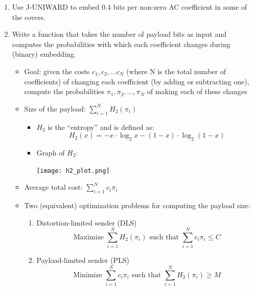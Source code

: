 \documentclass[11pt,a4paper]{report}
\begin{document}
\begin{itemize}
\begin{enumerate}
  \item Use J-UNIWARD to embed 0.4 bits per non-zero AC coefficient in some of the covers.

  \item Write a function that takes the number of payload bits as input and computes the probabilities with which each coefficient changes during (binary) embedding.
    \begin{itemize}
    \item Goal: given the costs $c_1, c_2, ... c_N$ (where N is the total number of coefficients) of changing each coefficient (by adding or subtracting one), compute the probabilities $\pi_1, \pi_2, ..., \pi_N$ of making each of these changes

    \item Size of the payload: $\sum\limits_{i=1}^N H_2(\pi_i)$
      \begin{itemize}
      \item $H_2$ is the ``entropy'' and is defined as:
        \begin{equation*}
        H_2(x) = -x \cdot \log_2 x - (1-x) \cdot \log_2 (1-x)
        \end{equation*}

      \item Graph of $H_2$:
        \begin{center}
          \texttt{[image: h2\_plot.png]}
        \end{center}
      \end{itemize}

    \item Average total cost: $\sum\limits_{i=1}^N c_i \pi_i$

    \item Two (equivalent) optimization problems for computing the payload size:
      \begin{enumerate}
      \item Distortion-limited sender (DLS)
        \begin{equation*}
        \text{Maximize } \sum\limits_{i=1}^N H_2(\pi_i) \text{ such that } \sum\limits_{i=1}^N c_i \pi_i \leq C
        \end{equation*}

      \item Payload-limited sender (PLS)
        \begin{equation*}
        \text{Minimize } \sum\limits_{i=1}^N c_i \pi_i \text{ such that } \sum\limits_{i=1}^N H_2(\pi_i) \geq M
        \end{equation*}
      \end{enumerate}


\end{itemize}
\end{enumerate}
\end{itemize}
\end{document}
